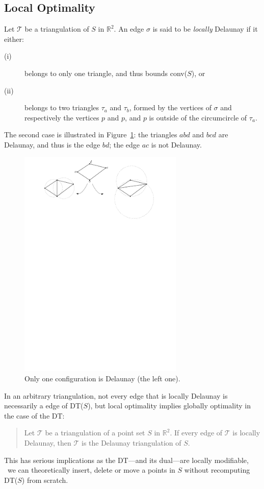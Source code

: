 \subsection{Local Optimality}
Let $\mathcal{T}$ be a triangulation of $S$ in $\mathbb{R}^2$. 
An edge $\sigma$ is said to be \emph{locally} Delaunay if it either:
\begin{description}
  \item[(i)] belongs to only one triangle, and thus bounds conv($S$), or
  \item[(ii)] belongs to two triangles $\tau_a$ and $\tau_b$, formed by the vertices of $\sigma$ and respectively the vertices $p$ and $p$, and $p$ is outside of the circumcircle of $\tau_a$. 
\end{description}
The second case is illustrated in Figure~\ref{fig:local}: the triangles $abd$ and $bcd$ are Delaunay, and thus is the edge $bd$; the edge $ac$ is not Delaunay.
\begin{figure}
  \centering
  \includegraphics[width=0.7\textwidth]{figs/local}
  \caption{Only one configuration is Delaunay (the left one).} 
\label{fig:local}
\end{figure}
In an arbitrary triangulation, not every edge that is locally Delaunay is necessarily a edge of DT($S$), but local optimality implies globally optimality in the case of the DT:
\begin{quote}
  Let $\mathcal{T}$ be a triangulation of a point set $S$ in $\mathbb{R}^2$. If every edge of $\mathcal{T}$ is locally Delaunay, then $\mathcal{T}$ is the Delaunay triangulation of $S$.
\end{quote}
This has serious implications as the DT---and its dual---are locally modifiable, \ie\ we can theoretically insert, delete or move a points in $S$ without recomputing DT($S$) from scratch.



